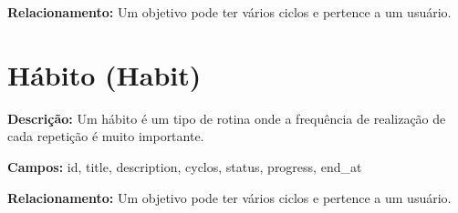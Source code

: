 \textbf{Relacionamento:} Um objetivo pode ter vários ciclos e pertence a um usuário.

\section{Hábito (Habit)}

\textbf{Descrição:} Um hábito é um tipo de rotina onde a frequência de realização de cada repetição é muito importante.

\textbf{Campos:} id, title, description, cyclos, status, progress, end\_at

\textbf{Relacionamento:} Um objetivo pode ter vários ciclos e pertence a um usuário.
